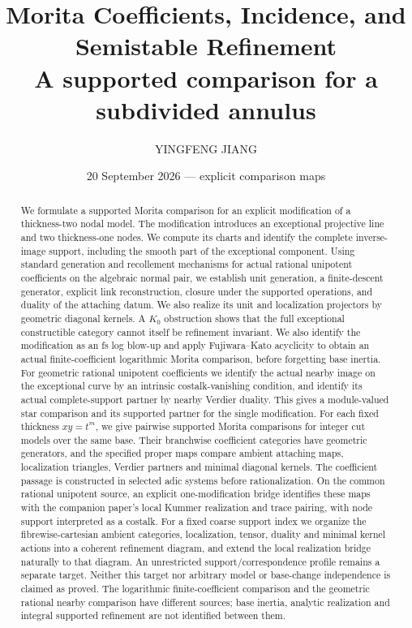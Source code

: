 \documentclass[11pt]{article}
\title{Morita Coefficients, Incidence, and Semistable Refinement\\
\large A supported comparison for a subdivided annulus}
\author{YINGFENG JIANG}
\date{20 September 2026 --- explicit comparison maps}
\theoremstyle{definition}
\theoremstyle{remark}
\begin{document}
\maketitle
\begin{abstract}
We formulate a supported Morita comparison for an explicit modification
of a thickness-two nodal model.  The modification introduces an exceptional
projective line and two thickness-one nodes.  We compute its charts and
identify the complete inverse-image support, including the smooth part of
the exceptional component.  Using standard generation and recollement mechanisms for actual rational
unipotent coefficients on the algebraic normal pair, we establish unit generation, a finite-descent generator, explicit link
reconstruction, closure under the supported operations, and duality of
the attaching datum.  We also realize its unit and localization projectors
by geometric diagonal kernels.  A $K_0$ obstruction shows that the full
exceptional constructible category cannot itself be refinement invariant.
We also identify the modification as an fs log blow-up and apply
Fujiwara--Kato acyclicity to obtain an actual finite-coefficient
logarithmic Morita comparison, before forgetting base inertia.
For geometric rational unipotent coefficients we identify the actual
nearby image on the exceptional curve by an intrinsic costalk-vanishing
condition, and identify its actual complete-support partner by nearby
Verdier duality.  This gives a module-valued star comparison and its
supported partner for the single modification.  For each fixed thickness
$xy=t^m$, we give pairwise supported Morita comparisons for integer
cut models over the same base.  Their branchwise coefficient categories
have geometric generators, and the specified proper maps compare
ambient attaching maps, localization triangles, Verdier partners and
minimal diagonal kernels.  The coefficient passage is constructed in
selected adic systems before rationalization.  On the common rational
unipotent source, an explicit one-modification bridge identifies these
maps with the companion paper's local Kummer realization and trace
pairing, with node support interpreted as a costalk.  For a fixed coarse support index we organize the fibrewise-cartesian
ambient categories, localization, tensor, duality and minimal kernel
actions into a coherent refinement diagram, and extend the local
realization bridge naturally to that diagram.  An unrestricted
support/correspondence profile remains a separate target.  Neither this target nor arbitrary model or
base-change independence is claimed as proved.  The logarithmic
finite-coefficient comparison and the geometric rational nearby
comparison have different sources; base inertia, analytic realization
and integral supported refinement are not identified between them.
\end{abstract}
\end{document}
